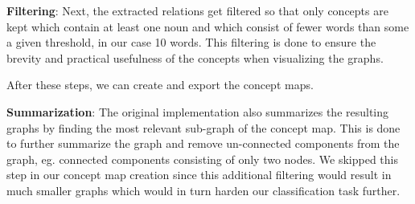\textbf{Filtering}:
Next, the extracted relations get filtered so that only concepts are kept which contain at least one noun and which consist of fewer words than some a given threshold, in our case 10 words. This filtering is done to ensure the brevity and practical usefulness of the concepts when visualizing the graphs.


After these steps, we can create and export the concept maps.

\textbf{Summarization}:
The original implementation also summarizes the resulting graphs by finding the most relevant sub-graph of the concept map.
This is done to further summarize the graph and remove un-connected components from the graph, eg. connected components consisting of only two nodes.
We skipped this step in our concept map creation since this additional filtering would result in much smaller graphs which would in turn harden our classification task further.